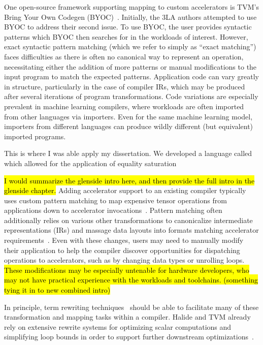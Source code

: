 One open-source framework
  supporting mapping
  to custom accelerators
  is TVM's Bring Your Own Codegen (BYOC)~\cite{byoc,chen2021byoc}.
Initially, the 3LA authors
  attempted to use BYOC
  to address their second issue.
To use BYOC, the user
  provides syntactic patterns
  which BYOC then searches for
  in the workloads of interest.
However,
  exact syntactic pattern matching 
  (which we refer to simply as
    ``exact matching'')
  faces difficulties
  as there is often no canonical way
  to represent an operation,
  necessitating either the addition of more patterns
  or manual modifications to the input program
  to match the expected patterns.
Application code can vary greatly in structure,
  particularly in the case of compiler IRs,
  which may be produced after several iterations
  of program transformations.
Code variations are especially prevalent
  in machine learning compilers,
  where workloads are often imported
  from other languages via importers.
Even for the same machine learning model,
  importers from different languages
  can produce wildly different (but equivalent)
  imported programs.
 
This is where I was able
  apply my dissertation.
We developed a language
  called \g
  which allowed for the application
  of equality saturation



\hl{I would summarize the glenside intro here, and then provide the full intro in the glenside chapter.}
Adding accelerator support to
  an existing compiler typically
  uses custom pattern matching to
  map expensive tensor operations
  from applications down to
  accelerator invocations~\cite{
    yang2020interstellar, byoc}.
Pattern matching often additionally relies on
  various other transformations
  to canonicalize intermediate representations (IRs)
  and massage data layouts into
  formats matching accelerator requirements~\cite{nvidia2020nhwc}.
Even with these changes,
  users may need to manually modify their application to
  help the compiler discover opportunities
  for dispatching operations to accelerators, 
  such as by changing data types or unrolling loops.
\hl{
These modifications may be especially
  untenable
  for hardware developers,
  who may not have practical experience
  with the workloads
  and toolchains. 
(something tying it in to new combined intro)
}
    
In principle, term rewriting techniques~\cite{baader1998term}
  should be able to facilitate many of
  these transformation and mapping tasks
  within a compiler.
Halide and TVM already rely
  on extensive rewrite systems for
  optimizing scalar computations and
  simplifying loop bounds in order to
  support further downstream optimizations~\cite{newcomb2020halide-rewrite,
  hagedorn2020func-high-perf}.

